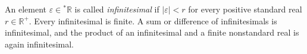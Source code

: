 An element $\varepsilon \in {}^*\mathbb{R}$ is called \emph{infinitesimal} if $|\varepsilon| < r$ for every positive standard real $r \in \mathbb{R}^+$. Every infinitesimal is finite. A sum or difference of infinitesimals is infinitesimal, and the product of an infinitesimal and a finite nonstandard real is again infinitesimal.
